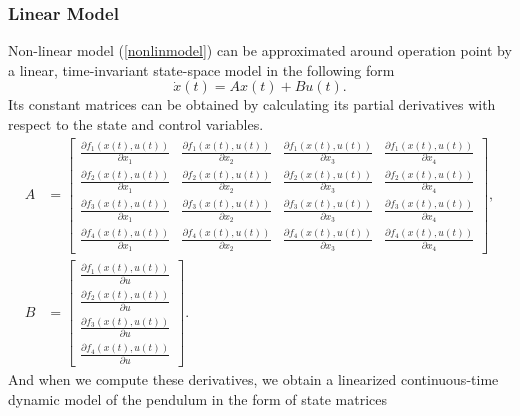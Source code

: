 \subsubsection{Linear Model}
Non-linear model (\ref{nonlinmodel}) can be approximated around operation point by a linear, time-invariant state-space model in the following form
\begin{equation}\dot{x}(t) = Ax(t) + Bu(t).\end{equation}
Its constant matrices can be obtained by calculating its partial derivatives with respect to the state and control variables.
\begin{subequations}
	\begin{align}
	A &= \begin{bmatrix}
	\frac{\partial f_1(x(t),u(t))}{\partial x_1}&\frac{\partial f_1(x(t),u(t))}{\partial x_2}&\frac{\partial f_1(x(t),u(t))}{\partial x_3}&\frac{\partial f_1(x(t),u(t))}{\partial x_4}\\
	\frac{\partial f_2(x(t),u(t))}{\partial x_1}&\frac{\partial f_2(x(t),u(t))}{\partial x_2}&\frac{\partial f_2(x(t),u(t))}{\partial x_3}&\frac{\partial f_2(x(t),u(t))}{\partial x_4}\\
	\frac{\partial f_3(x(t),u(t))}{\partial x_1}&\frac{\partial f_3(x(t),u(t))}{\partial x_2}&\frac{\partial f_3(x(t),u(t))}{\partial x_3}&\frac{\partial f_3(x(t),u(t))}{\partial x_4}\\
	\frac{\partial f_4(x(t),u(t))}{\partial x_1}&\frac{\partial f_4(x(t),u(t))}{\partial x_2}&\frac{\partial f_4(x(t),u(t))}{\partial x_3}&\frac{\partial f_4(x(t),u(t))}{\partial x_4}
	\end{bmatrix},\\ 
	B &= \begin{bmatrix}
	\frac{\partial f_1(x(t),u(t))}{\partial u}\\\frac{\partial f_2(x(t),u(t))}{\partial u}\\\frac{\partial f_3(x(t),u(t))}{\partial u}\\\frac{\partial f_4(x(t),u(t))}{\partial u}
	\end{bmatrix}.
	\end{align}
\end{subequations}
And when we compute these derivatives, we obtain a linearized continuous-time dynamic model of the pendulum in the form of state matrices
